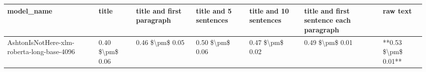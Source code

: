 \begin{tabular}{lllllll}
\toprule
                                model\_name &           title & title and first paragraph & title and 5 sentences & title and 10 sentences & title and first sentence each paragraph &            raw text \\
\midrule
AshtonIsNotHere-xlm-roberta-long-base-4096 & 0.40 \$\textbackslash pm\$ 0.06 &           0.46 \$\textbackslash pm\$ 0.05 &       0.50 \$\textbackslash pm\$ 0.06 &        0.47 \$\textbackslash pm\$ 0.02 &                         0.49 \$\textbackslash pm\$ 0.01 & **0.53 \$\textbackslash pm\$ 0.01** \\
\bottomrule
\end{tabular}

